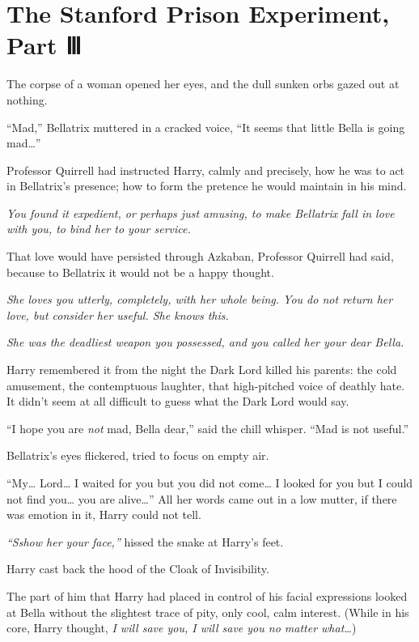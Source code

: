 \chapter{The Stanford Prison Experiment, Part Ⅲ}

The corpse of a woman opened her eyes, and the dull sunken orbs gazed
out at nothing.

``Mad,'' Bellatrix muttered in a cracked voice, ``It seems that little
Bella is going mad\ldots{}''

Professor Quirrell had instructed Harry, calmly and precisely, how he
was to act in Bellatrix's presence; how to form the pretence he would
maintain in his mind.

\emph{You found it expedient, or perhaps just amusing, to make Bellatrix
fall in love with you, to bind her to your service.}

That love would have persisted through Azkaban, Professor Quirrell had
said, because to Bellatrix it would not be a happy thought.

\emph{She loves you utterly, completely, with her whole being. You do
not return her love, but consider her useful. She knows this.}

\emph{She was the deadliest weapon you possessed, and you called her
your dear Bella.}

Harry remembered it from the night the Dark Lord killed his parents: the
cold amusement, the contemptuous laughter, that high-pitched voice of
deathly hate. It didn't seem at all difficult to guess what the Dark
Lord would say.

``I hope you are \emph{not} mad, Bella dear,'' said the chill whisper.
``Mad is not useful.''

Bellatrix's eyes flickered, tried to focus on empty air.

``My\ldots{} Lord\ldots{} I waited for you but you did not come\ldots{}
I looked for you but I could not find you\ldots{} you are
alive\ldots{}'' All her words came out in a low mutter, if there was
emotion in it, Harry could not tell.

\emph{``Sshow her your face,''} hissed the snake at Harry's feet.

Harry cast back the hood of the Cloak of Invisibility.

The part of him that Harry had placed in control of his facial
expressions looked at Bella without the slightest trace of pity, only
cool, calm interest. (While in his core, Harry thought, \emph{I will
save you, I will save you no matter what\ldots{}})

